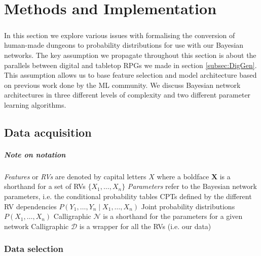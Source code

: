 \documentclass{UoYCSproject}
\begin{document}
\chapter{Methods and Implementation}

\paragraph{}
In this section we explore various issues with formalising the conversion of human-made dungeons to probability distributions for use with our Bayesian networks. The key assumption we propagate throughout this section is about the parallels between digital and tabletop RPGs we made in section \ref{subsec:DigGen}. This assumption allows us to base feature selection and model architecture based on previous work done by the ML community. We discuss Bayesian network architectures in three different levels of complexity and two different parameter learning algorithms.

\section{Data acquisition}

\paragraph{Note on notation}
\begin{outline}
  \1 \textit{Features} or \textit{RVs} are denoted by capital letters \(X\) where a boldface \(\boldsymbol{X}\) is a shorthand for a set of RVs \(\{X_1, \ldots, X_n\}\)
  \1 \textit{Parameters} refer to the Bayesian network parameters, i.e. the conditional probability tables CPTs defined by the different RV dependencies \(P(Y_1, \ldots, Y_n \mid X_1, \ldots , X_n)\)
  \1 Joint probability distributions \(P(X_1, \ldots , X_n)\)
  \1 Calligraphic \(\mathcal{N}\) is a shorthand for the parameters for a given network
  \1 Calligraphic \(\mathcal{D}\) is a wrapper for all the RVs (i.e. our data)
\end{outline}

\subsection{Data selection} %
\end{document}
